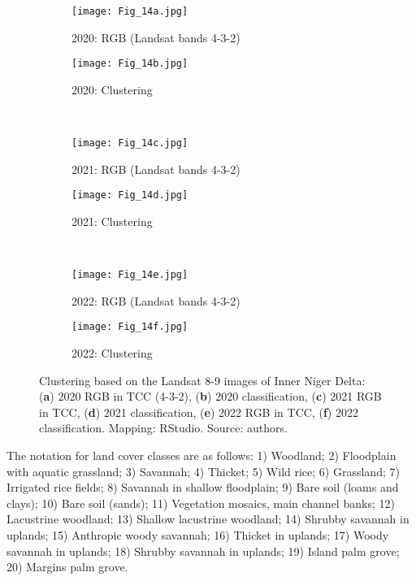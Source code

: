 \documentclass[12pt,a4paper,oneside]{article}
\def \newpar{\vspace{6pt}}
\begin{document}
\begin{figure}[H]
	\begin{subfigure}[b]{.5\textwidth}
		\centering
			\texttt{[image: Fig\_14a.jpg]}
		\caption{2020: RGB (Landsat bands 4-3-2)}
	\end{subfigure}%
	\begin{subfigure}[b]{.5\textwidth}
		\centering
		\texttt{[image: Fig\_14b.jpg]}
		\caption{2020: Clustering}
	\end{subfigure}%
\\
\vfill \vspace{1mm}
	\begin{subfigure}[b]{.5\textwidth}
		\centering
			\texttt{[image: Fig\_14c.jpg]}
		\caption{2021: RGB (Landsat bands 4-3-2)}
	\end{subfigure}%
	\begin{subfigure}[b]{.5\textwidth}
		\centering
		\texttt{[image: Fig\_14d.jpg]}
		\caption{2021: Clustering}
	\end{subfigure}%
\\
\vfill \vspace{1mm}
	\begin{subfigure}[b]{.5\textwidth}
		\centering
			\texttt{[image: Fig\_14e.jpg]}
		\caption{2022: RGB (Landsat bands 4-3-2)}
	\end{subfigure}%
	\begin{subfigure}[b]{.5\textwidth}
		\centering
		\texttt{[image: Fig\_14f.jpg]}
		\caption{2022: Clustering}
	\end{subfigure}%
\vspace*{20pt}\caption{Clustering based on the Landsat 8-9 images of Inner Niger Delta: (\textbf{a}) 2020 RGB in TCC (4-3-2), (\textbf{b}) 2020 classification, (\textbf{c}) 2021 RGB in TCC, (\textbf{d}) 2021 classification, (\textbf{e}) 2022 RGB in TCC, (\textbf{f}) 2022 classification. Mapping: RStudio. Source: authors.}\label{fig14}
\end{figure}

\newpar The notation for land cover classes are as follows: 1) Woodland; 2) Floodplain with aquatic grassland; 3) Savannah; 4) Thicket; 5) Wild rice; 6) Grassland; 7) Irrigated rice fields; 8) Savannah in shallow floodplain; 9) Bare soil (loams and clays); 10) Bare soil (sands); 11) Vegetation mosaics, main channel banks; 12) Lacustrine woodland; 13) Shallow lacustrine woodland; 14) Shrubby savannah in uplands; 15) Anthropic woody savannah; 16) Thicket in uplands; 17) Woody savannah in uplands; 18) Shrubby savannah in uplands; 19) Island palm grove; 20) Margins palm grove.
\end{document}
